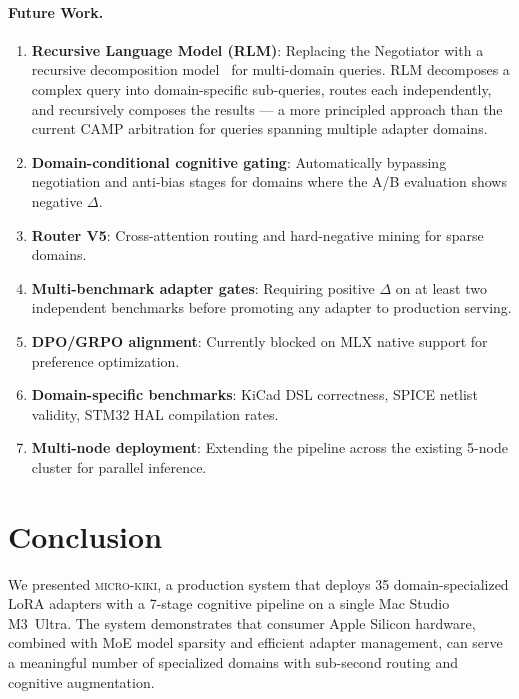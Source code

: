 \documentclass[11pt,a4paper]{article}
\begin{document}
\paragraph{Future Work.}
\begin{enumerate}[nosep]
  \item \textbf{Recursive Language Model (RLM)}: Replacing the Negotiator with a recursive decomposition model~\citep{rlm2025} for multi-domain queries. RLM decomposes a complex query into domain-specific sub-queries, routes each independently, and recursively composes the results --- a more principled approach than the current CAMP arbitration for queries spanning multiple adapter domains.
  \item \textbf{Domain-conditional cognitive gating}: Automatically bypassing negotiation and anti-bias stages for domains where the A/B evaluation shows negative $\Delta$.
  \item \textbf{Router V5}: Cross-attention routing and hard-negative mining for sparse domains.
  \item \textbf{Multi-benchmark adapter gates}: Requiring positive $\Delta$ on at least two independent benchmarks before promoting any adapter to production serving.
  \item \textbf{DPO/GRPO alignment}: Currently blocked on MLX native support for preference optimization.
  \item \textbf{Domain-specific benchmarks}: KiCad DSL correctness, SPICE netlist validity, STM32 HAL compilation rates.
  \item \textbf{Multi-node deployment}: Extending the pipeline across the existing 5-node cluster for parallel inference.
\end{enumerate}

\section{Conclusion}
\label{sec:conclusion}

We presented \textsc{micro-kiki}, a production system that deploys 35 domain-specialized LoRA adapters with a 7-stage cognitive pipeline on a single Mac Studio M3~Ultra. The system demonstrates that consumer Apple Silicon hardware, combined with MoE model sparsity and efficient adapter management, can serve a meaningful number of specialized domains with sub-second routing and cognitive augmentation.
\end{document}
